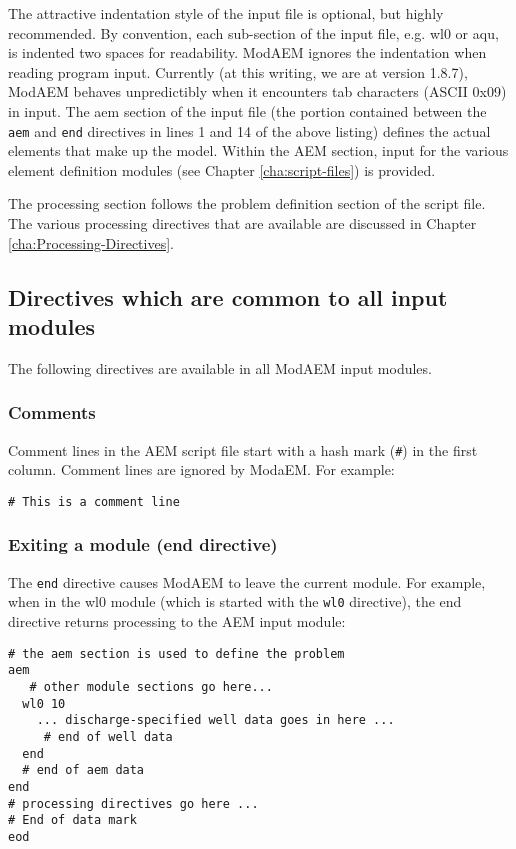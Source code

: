The attractive indentation style of the input file is optional, but highly recommended. By convention, each sub-section of the input file, e.g. \textsf{wl0} or \textsf{aqu}, 
is indented two spaces for readability. ModAEM ignores the indentation
when reading program input. Currently (at this writing, we are at
version 1.8.7), ModAEM behaves unpredictibly when it encounters
tab characters (ASCII 0x09) in input. The \textsf{aem} section of the input file (the portion contained between the \texttt{aem} and \texttt{end}
directives in lines 1 and 14 of the above listing) defines the actual elements that make up the model. Within the AEM
section, input for the various element definition modules (see Chapter
\ref{cha:script-files}) is provided.

The processing section follows the problem definition section of the
script file. The various processing directives that are available
are discussed in Chapter \ref{cha:Processing-Directives}.

\subsection{Directives which are common to all input modules}

The following directives are available in all ModAEM input modules.

\subsubsection{Comments}

Comment lines in the AEM script file start with a hash mark (\texttt{\#})
in the first column. Comment lines are ignored by ModaEM. For example:
\begin{verbatim}
# This is a comment line
\end{verbatim}

\subsubsection{Exiting a module (\textsf{\textmd{end}} directive) }

The \texttt{end} directive causes ModAEM to leave the current module.
For example, when in the \textsf{wl0} module (which is started with
the \texttt{wl0} directive), the end directive returns processing
to the AEM input module:
\begin{verbatim}
# the aem section is used to define the problem 
aem
   # other module sections go here...
  wl0 10
    ... discharge-specified well data goes in here ...
     # end of well data 
  end
  # end of aem data
end 
# processing directives go here ...
# End of data mark 
eod
\end{verbatim}

